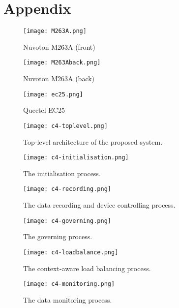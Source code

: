 \documentclass[../thesis.tex]{subfiles}
\begin{document}
\chapter*{Appendix}

\begin{figure}[!ht]
\texttt{[image: M263A.png]}
\caption{Nuvoton M263A (front) \cite{Nuvoton}}
\label{fig:m263A}
\end{figure}

\begin{figure}[!ht]
\texttt{[image: M263Aback.png]}
\caption{Nuvoton M263A (back) \cite{Nuvoton}}
\label{fig:m263Aback}
\end{figure}

\begin{figure}[!ht]
\centering
\texttt{[image: ec25.png]}
\caption{Quectel EC25 \cite{Quectel}}
\label{fig:quectelEC25}
\end{figure}

\begin{figure}[!ht]
\centering
\texttt{[image: c4-toplevel.png]}
\caption{Top-level architecture of the proposed system.}
\label{fig:toplevel}
\end{figure}

\begin{figure}[!ht]
\centering
\texttt{[image: c4-initialisation.png]}
\caption{The initialisation process.}
\label{fig:init}
\end{figure}

\begin{figure}[!ht]
\centering
\texttt{[image: c4-recording.png]}
\caption{The data recording and device controlling process.}
\label{fig:record}
\end{figure}

\begin{figure}[!ht]
\centering
\texttt{[image: c4-governing.png]}
\caption{The governing process.}
\label{fig:governing}
\end{figure}

\begin{figure}[!ht]
\centering
\texttt{[image: c4-loadbalance.png]}
\caption{The context-aware load balancing process.}
\label{fig:loadbalancing}
\end{figure}

\begin{figure}[!ht]
\centering
\texttt{[image: c4-monitoring.png]}
\caption{The data monitoring process.}
\label{fig:monitoring}
\end{figure}
\end{document}
